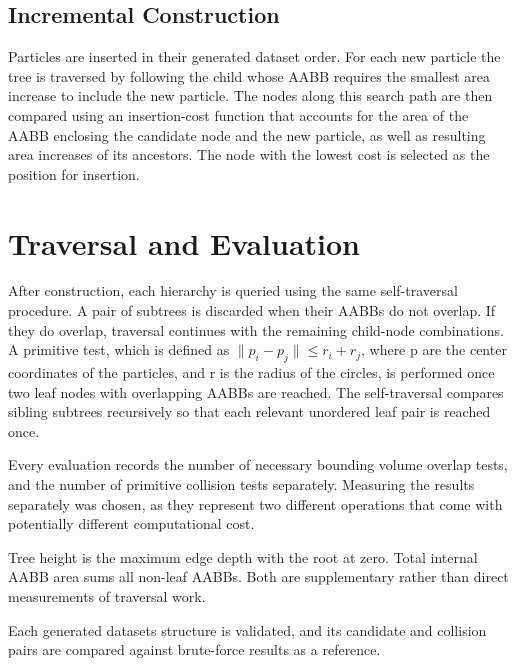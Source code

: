 \subsection{Incremental Construction}

Particles are inserted in their generated dataset order.
For each new particle the tree is traversed by following the child whose AABB requires the smallest area increase to include the new particle.
The nodes along this search path are then compared using an insertion-cost function that accounts for the area of the AABB enclosing the candidate node and the new particle, as well as resulting area increases of its ancestors. 
The node with the lowest cost is selected as the position for insertion.

\section{Traversal and Evaluation}

After construction, each hierarchy is queried using the same self-traversal procedure. 
A pair of subtrees is discarded when their AABBs do not overlap. 
If they do overlap, traversal continues with the remaining child-node combinations. 
A primitive test, which is defined as \(\lVert p_i-p_j\rVert \le r_i+r_j\), where p are the center coordinates of the particles, and r is the radius of the circles, is performed once two leaf nodes with overlapping AABBs are reached.
The self-traversal compares sibling subtrees recursively so that each relevant unordered leaf pair is reached once.

Every evaluation records the number of necessary bounding volume overlap tests, and the number of primitive collision tests separately.
Measuring the results separately was chosen, as they represent two different operations that come with potentially different computational cost.

Tree height is the maximum edge depth with the root at zero. 
Total internal AABB area sums all non-leaf AABBs. 
Both are supplementary rather than direct measurements of traversal work.

Each generated datasets structure is validated, and its candidate and collision pairs are compared against brute-force results as a reference.




\newpage